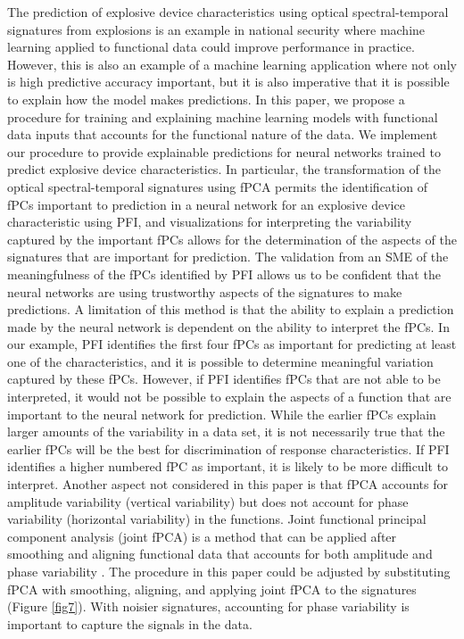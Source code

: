 \documentclass[letterpaper]{article}
\begin{document}
The prediction of explosive device characteristics using optical spectral-temporal signatures from explosions is an example in national security where machine learning applied to functional data could improve performance in practice. However, this is also an example of a machine learning application where not only is high predictive accuracy important, but it is also imperative that it is possible to explain how the model makes predictions. In this paper, we propose a procedure for training and explaining machine learning models with functional data inputs that accounts for the functional nature of the data. We implement our procedure to provide explainable predictions for neural networks trained to predict explosive device characteristics. In particular, the transformation of the optical spectral-temporal signatures using fPCA permits the identification of fPCs important to prediction in a neural network for an explosive device characteristic using PFI, and visualizations for interpreting the variability captured by the important fPCs allows for the determination of the aspects of the signatures that are important for prediction. The validation from an SME of the meaningfulness of the fPCs identified by PFI allows us to be confident that the neural networks are using trustworthy aspects of the signatures to make predictions.  A limitation of this method is that the ability to explain a prediction made by the neural network is dependent on the ability to interpret the fPCs. In our example, PFI identifies the first four fPCs as important for predicting at least one of the characteristics, and it is possible to determine meaningful variation captured by these fPCs. However, if PFI identifies fPCs that are not able to be interpreted, it would not be possible to explain the aspects of a function that are important to the neural network for prediction. While the earlier fPCs explain larger amounts of the variability in a data set, it is not necessarily true that the earlier fPCs will be the best for discrimination of response characteristics. If PFI identifies a higher numbered fPC as important, it is likely to be more difficult to interpret.  Another aspect not considered in this paper is that fPCA accounts for amplitude variability (vertical variability) but does not account for phase variability (horizontal variability) in the functions. Joint functional principal component analysis (joint fPCA) is a method that can be applied after smoothing and aligning functional data that accounts for both amplitude and phase variability \cite{lee:2017,tucker:2013}. The procedure in this paper could be adjusted by substituting fPCA with smoothing, aligning, and applying joint fPCA to the signatures (Figure \ref{fig7}). With noisier signatures, accounting for phase variability is important to capture the signals in the data.
\end{document}
